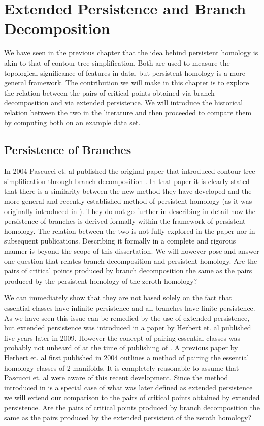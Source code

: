 \chapter{Extended Persistence and Branch Decomposition}
\label{chapter6}

We have seen in the previous chapter that the idea behind persistent homology is akin to that of contour tree simplification. Both are used to measure the topological significance of features in data, but persistent homology is a more general framework. The contribution we will make in this chapter is to explore the relation between the pairs of critical points obtained via branch decomposition and via extended persistence. We will introduce the historical relation between the two in the literature and then proceeded to compare them by computing both on an example data set.

\section{Persistence of Branches}

In 2004 Pascucci et. al published the original paper that introduced contour tree simplification through branch decomposition \cite{ct-branch-decomp}. In that paper it is clearly stated that there is a similarity between the new method they have developed and the more general and recently established method of persistent homology (as it was originally introduced in \cite{persistence-original}). They do not go further in describing in detail how the persistence of branches is derived formally within the framework of persistent homology. The relation between the two is not fully explored in the paper nor in subsequent publications. Describing it formally in a complete and rigorous manner is beyond the scope of this dissertation. We will however pose and answer one question that relates branch decomposition and persistent homology. Are the pairs of critical points produced by branch decomposition the same as the pairs produced by the persistent homology of the zeroth homology?

We can immediately show that they are not based solely on the fact that essential classes have infinite persistence and all branches have finite persistence. As we have seen this issue can be remedied by the use of extended persistence, but extended persistence was introduced in a paper by Herbert et. al \cite{persistence-extended} published five years later in 2009. However the concept of pairing essential classes was probably not unheard of at the time of publishing of \cite{ct-branch-decomp}. A previous paper \cite{extreme-elevation} by Herbert et. al first published in 2004 outlines a method of pairing the essential homology classes of 2-manifolds. It is completely reasonable to assume that Pascucci et. al were aware of this recent development. Since the method introduced in \cite{extreme-elevation} is a special case of what was later defined as extended persistence we will extend our comparison to the pairs of critical points obtained by extended persistence. Are the pairs of critical points produced by branch decomposition the same as the pairs produced by the extended persistent of the zeroth homology?

